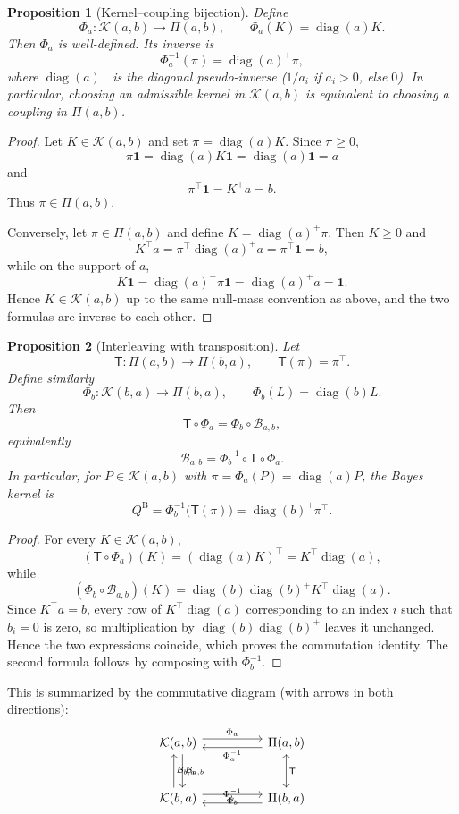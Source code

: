 \documentclass[11pt]{article}
\newcommand{\ones}{\mathbf{1}}
\newcommand{\diag}{\operatorname{diag}}
\newcommand{\Kset}{\mathcal{K}}
\newcommand{\Piset}{\Pi}
\newtheorem{proposition}{Proposition}
\begin{document}
\begin{proposition}[Kernel--coupling bijection]
Define
\[
\Phi_a:\Kset(a,b)\to\Piset(a,b),\qquad \Phi_a(K)=\diag(a)K.
\]
Then $\Phi_a$ is well-defined. Its inverse is
\[
\Phi_a^{-1}(\pi)=\diag(a)^+\pi,
\]
where $\diag(a)^+$ is the diagonal pseudo-inverse ($1/a_i$ if $a_i>0$, else $0$). In particular, choosing an admissible kernel in $\Kset(a,b)$ is equivalent to choosing a coupling in $\Piset(a,b)$.
\end{proposition}
\begin{proof}
Let $K\in\Kset(a,b)$ and set $\pi=\diag(a)K$. Since $\pi\geq 0$,
\[
\pi\ones=\diag(a)K\ones=\diag(a)\ones=a
\]
and
\[
\pi^\top \ones = K^\top a=b.
\]
Thus $\pi\in\Piset(a,b)$.

Conversely, let $\pi\in\Piset(a,b)$ and define $K=\diag(a)^+\pi$. Then $K\geq0$ and
\[
K^\top a=\pi^\top \diag(a)^+ a = \pi^\top \ones = b,
\]
while on the support of $a$,
\[
K\ones=\diag(a)^+\pi\ones=\diag(a)^+ a=\ones.
\]
Hence $K\in\Kset(a,b)$ up to the same null-mass convention as above, and the two formulas are inverse to each other.
\end{proof}

\begin{proposition}[Interleaving with transposition]
Let
\[
\mathsf T:\Piset(a,b)\to\Piset(b,a),\qquad \mathsf T(\pi)=\pi^\top.
\]
Define similarly
\[
\Phi_b:\Kset(b,a)\to\Piset(b,a),\qquad \Phi_b(L)=\diag(b)L.
\]
Then
\[
\mathsf T\circ \Phi_a=\Phi_b\circ \mathcal B_{a,b},
\]
equivalently
\[
\mathcal B_{a,b}=\Phi_b^{-1}\circ \mathsf T\circ \Phi_a.
\]
In particular, for $P\in\Kset(a,b)$ with $\pi=\Phi_a(P)=\diag(a)P$, the Bayes kernel is
\[
Q^{\mathrm B}=\Phi_b^{-1}\!\big(\mathsf T(\pi)\big)=\diag(b)^+\pi^\top.
\]
\end{proposition}
\begin{proof}
For every $K\in\Kset(a,b)$,
\[
(\mathsf T\circ \Phi_a)(K)
=
(\diag(a)K)^\top
=
K^\top\diag(a),
\]
while
\[
(\Phi_b\circ \mathcal B_{a,b})(K)
=
\diag(b)\diag(b)^+K^\top\diag(a).
\]
Since $K^\top a=b$, every row of $K^\top\diag(a)$ corresponding to an index $i$ such that $b_i=0$ is zero, so multiplication by $\diag(b)\diag(b)^+$ leaves it unchanged. Hence the two expressions coincide, which proves the commutation identity. The second formula follows by composing with $\Phi_b^{-1}$.
\end{proof}

This is summarized by the commutative diagram (with arrows in both directions):
\[
\begin{tikzcd}[column sep=huge,row sep=large]
\Kset(a,b)
  \arrow[r,shift left=0.8ex,"\Phi_a"]
  \arrow[d,shift left=0.8ex,"\mathcal B_{a,b}"]
&
\Piset(a,b)
  \arrow[l,shift left=0.8ex,"\Phi_a^{-1}"]
  \arrow[d,leftrightarrow,"\mathsf T"]
\\
\Kset(b,a)
  \arrow[r,shift left=0.8ex,"\Phi_b"']
  \arrow[u,shift left=0.8ex,"\mathcal B_{b,a}"']
&
\Piset(b,a)
  \arrow[l,shift left=0.8ex,"\Phi_b^{-1}"']
\end{tikzcd}
\]
\end{document}
